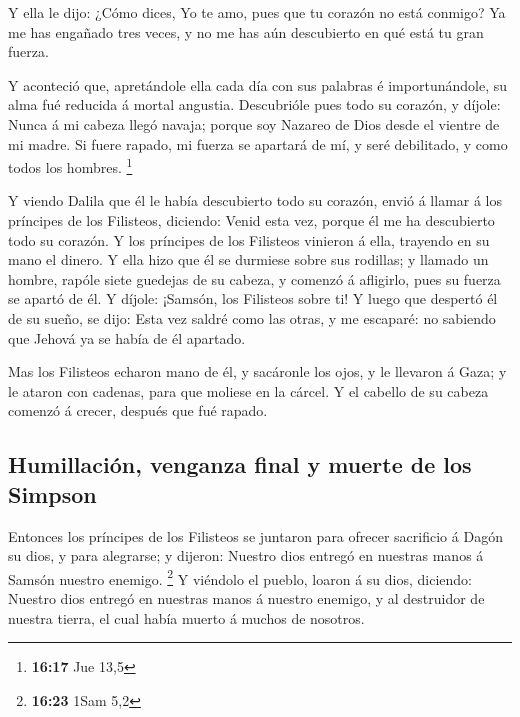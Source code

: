  Y ella le dijo: ¿Cómo dices, Yo te amo, pues que tu
corazón no está conmigo? Ya me has engañado tres veces, y no me has aún
descubierto en qué está tu gran fuerza.

 Y aconteció que, apretándole ella cada día con sus
palabras é importunándole, su alma fué reducida á mortal angustia.
 Descubrióle pues todo su corazón, y díjole: Nunca á mi
cabeza llegó navaja; porque soy Nazareo de Dios desde el vientre de mi
madre. Si fuere rapado, mi fuerza se apartará de mí, y seré debilitado,
y como todos los hombres. \footnote{\textbf{16:17} Jue 13,5}

 Y viendo Dalila que él le había descubierto todo su
corazón, envió á llamar á los príncipes de los Filisteos, diciendo:
Venid esta vez, porque él me ha descubierto todo su corazón. Y los
príncipes de los Filisteos vinieron á ella, trayendo en su mano el
dinero.  Y ella hizo que él se durmiese sobre sus rodillas;
y llamado un hombre, rapóle siete guedejas de su cabeza, y comenzó á
afligirlo, pues su fuerza se apartó de él.  Y díjole:
¡Samsón, los Filisteos sobre ti! Y luego que despertó él de su sueño, se
dijo: Esta vez saldré como las otras, y me escaparé: no sabiendo que
Jehová ya se había de él apartado.

 Mas los Filisteos echaron mano de él, y sacáronle los
ojos, y le llevaron á Gaza; y le ataron con cadenas, para que moliese en
la cárcel.  Y el cabello de su cabeza comenzó á crecer,
después que fué rapado.

\hypertarget{humillaciuxf3n-venganza-final-y-muerte-de-los-simpson}{%
\subsection{Humillación, venganza final y muerte de los
Simpson}\label{humillaciuxf3n-venganza-final-y-muerte-de-los-simpson}}

 Entonces los príncipes de los Filisteos se juntaron para
ofrecer sacrificio á Dagón su dios, y para alegrarse; y dijeron: Nuestro
dios entregó en nuestras manos á Samsón nuestro enemigo. \footnote{\textbf{16:23}
  1Sam 5,2}  Y viéndolo el pueblo, loaron á su dios,
diciendo: Nuestro dios entregó en nuestras manos á nuestro enemigo, y al
destruidor de nuestra tierra, el cual había muerto á muchos de nosotros.

